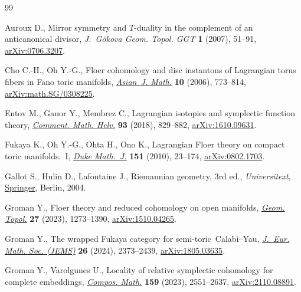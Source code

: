 \documentclass[10pt,a4paper]{amsart}
\numberwithin{equation}{section}
\theoremstyle{definition}
\begin{document}
\begin{thebibliography}{99}
\footnotesize\itemsep=0pt

Auroux D., Mirror symmetry and {$T$}-duality in the complement of an
 anticanonical divisor, \textit{J.~G\"okova Geom. Topol. GGT} \textbf{1}
 (2007), 51--91, \href{http://arxiv.org/abs/0706.3207}{arXiv:0706.3207}.

Cho C.-H., Oh Y.-G., Floer cohomology and disc instantons of {L}agrangian torus
 fibers in {F}ano toric manifolds,
 \href{https://doi.org/10.4310/AJM.2006.v10.n4.a10}{\textit{Asian~J. Math.}}
 \textbf{10} (2006), 773--814,
 \href{http://arxiv.org/abs/math.SG/0308225}{arXiv:math.SG/0308225}.

Entov M., Ganor Y., Membrez C., Lagrangian isotopies and symplectic function
 theory, \href{https://doi.org/10.4171/CMH/451}{\textit{Comment. Math. Helv.}}
 \textbf{93} (2018), 829--882,
 \href{http://arxiv.org/abs/1610.09631}{arXiv:1610.09631}.

Fukaya K., Oh Y.-G., Ohta H., Ono K., Lagrangian {F}loer theory on compact toric
 manifolds.~{I}, \href{https://doi.org/10.1215/00127094-2009-062}{\textit{Duke
 Math.~J.}} \textbf{151} (2010), 23--174,
 \href{http://arxiv.org/abs/0802.1703}{arXiv:0802.1703}.

Gallot S., Hulin D., Lafontaine J., Riemannian geometry, 3rd ed., \textit{Universitext},
 \href{https://doi.org/10.1007/978-3-642-18855-8}{Springer}, Berlin, 2004.

Groman Y., Floer theory and reduced cohomology on open manifolds,
 \href{https://doi.org/10.2140/gt.2023.27.1273}{\textit{Geom. Topol.}}
 \textbf{27} (2023), 1273--1390,
 \href{http://arxiv.org/abs/1510.04265}{arXiv:1510.04265}.

Groman Y., The wrapped {F}ukaya category for semi-toric~{C}alabi--{Y}au,
 \href{https://doi.org/10.4171/jems/1466}{\textit{J.~Eur. Math. Soc. (JEMS)}}
 \textbf{26} (2024), 2373--2439,
 \href{http://arxiv.org/abs/1805.03635}{arXiv:1805.03635}.

Groman Y., Varolgunes U., Locality of relative symplectic cohomology for
 complete embeddings,
 \href{https://doi.org/10.1112/s0010437x23007492}{\textit{Compos. Math.}}
 \textbf{159} (2023), 2551--2637,
 \href{http://arxiv.org/abs/2110.08891}{arXiv:2110.08891}.


\end{thebibliography}
\end{document}
